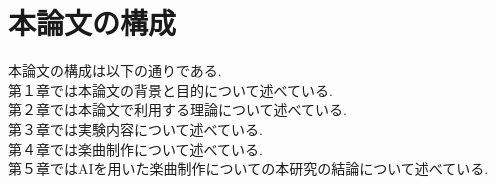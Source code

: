 \section{本論文の構成}
本論文の構成は以下の通りである.\\
第１章では本論文の背景と目的について述べている.\\
第２章では本論文で利用する理論について述べている.\\
第３章では実験内容について述べている.\\
第４章では楽曲制作について述べている.\\
第５章ではAIを用いた楽曲制作についての本研究の結論について述べている.\\
